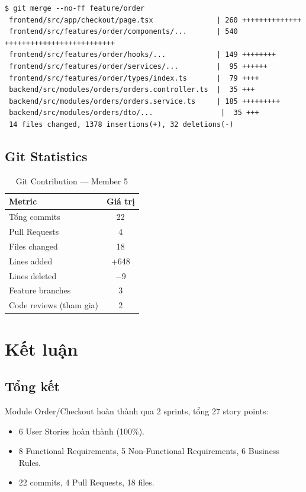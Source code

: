 \documentclass[12pt,a4paper]{article}
\begin{document}
\begin{lstlisting}[title=Merge vao main]
$ git merge --no-ff feature/order
 frontend/src/app/checkout/page.tsx               | 260 ++++++++++++++
 frontend/src/features/order/components/...       | 540 ++++++++++++++++++++++++++
 frontend/src/features/order/hooks/...            | 149 ++++++++
 frontend/src/features/order/services/...         |  95 ++++++
 frontend/src/features/order/types/index.ts       |  79 ++++
 backend/src/modules/orders/orders.controller.ts  |  35 +++
 backend/src/modules/orders/orders.service.ts     | 185 +++++++++
 backend/src/modules/orders/dto/...                |  35 +++
 14 files changed, 1378 insertions(+), 32 deletions(-)
\end{lstlisting}


\subsection{Git Statistics}

\begin{table}[H]
\centering
\caption{Git Contribution — Member 5}
\begin{tabular}{lc}
\toprule
\textbf{Metric} & \textbf{Giá trị} \\
\midrule
Tổng commits        & 22 \\
Pull Requests       & 4 \\
Files changed       & 18 \\
Lines added         & +648 \\
Lines deleted        & $-$9 \\
Feature branches    & 3 \\
Code reviews (tham gia) & 2 \\
\bottomrule
\end{tabular}
\end{table}

\section{Kết luận}

\subsection{Tổng kết}

Module Order/Checkout hoàn thành qua 2 sprints, tổng 27 story points:
\begin{itemize}
  \item 6 User Stories hoàn thành (100\%).
  \item 8 Functional Requirements, 5 Non-Functional Requirements, 6 Business Rules.
  \item 22 commits, 4 Pull Requests, 18 files.
\end{itemize}
\end{document}
